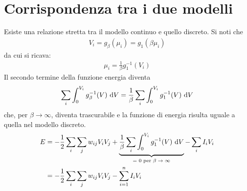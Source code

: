 \section{Corrispondenza tra i due modelli}
\label{sec:corrispondenza_tra_i_due_modelli}

Esiste una relazione stretta tra il modello continuo e quello discreto. Si noti che
\begin{align*}
	V_i = g_\beta(\mu_i) = g_1(\beta \mu_i)
\end{align*}
da cui si ricava:
\begin{align*}
	\mu_i = \frac{1}{\beta} g_1^{-1} (V_i)
\end{align*}
Il secondo termine della funzione energia diventa
\begin{align*}
	\sum_i \int_0^{V_i} g_\beta^{-1}(V) \, \, \mathrm{d} V = \frac{1}{\beta} \sum_i \int_0^{V_i} g_1^{-1}(V) \, \, \mathrm{d} V 
\end{align*}
che, per $\beta \rightarrow \infty$, diventa trascurabile e la funzione di energia risulta uguale a quella nel modello discreto.
\begin{align*}
	E &= - \frac{1}{2} \sum_i \sum_j w_{ij} V_i V_j + \underbrace{\frac{1}{\beta}  \sum_i \int_0^{V_i} g_1^{-1} (V) \, \, \mathrm{d} V}_\textrm{= 0 per $\beta \rightarrow \infty$}  - \sum_i I_i V_i \\
	&=  - \frac{1}{2} \sum_i \sum_j w_{ij} V_i V_j - \sum_{i=1}^n I_i V_i
\end{align*}
